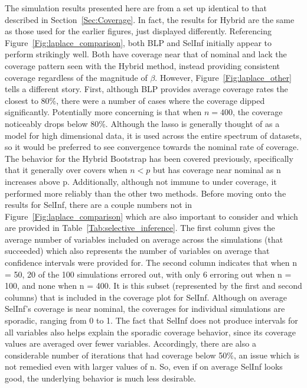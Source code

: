 The simulation results presented here are from a set up identical to that described in Section~\ref{Sec:Coverage}. In fact, the results for Hybrid are the same as those used for the earlier figures, just displayed differently. Referencing Figure~\ref{Fig:laplace_comparison}, both BLP and SelInf initially appear to perform strikingly well. Both have coverage near that of nominal and lack the coverage pattern seen with the Hybrid method, instead providing consistent coverage regardless of the magnitude of $\beta$. However, Figure~\ref{Fig:laplace_other} tells a different story. First, although BLP provides average coverage rates the closest to $80\%$, there were a number of cases where the coverage dipped significantly. Potentially more concerning is that when $n = 400$, the coverage noticeably drops below 80\%. Although the lasso is generally thought of as a model for high dimensional data, it is used across the entire spectrum of datasets, so it would be preferred to see convergence towards the nominal rate of coverage. The behavior for the Hybrid Bootstrap has been covered previously, specifically that it generally over covers when $n < p$ but has coverage near nominal as n increases above p. Additionally, although not immune to under coverage, it performed more reliably than the other two methods. Before moving onto the results for SelInf, there are a couple numbers not in Figure~\ref{Fig:laplace_comparison} which are also important to consider and which are provided in Table~\ref{Tab:selective_inference}. The first column gives the average number of variables included on average across the simulations (that succeeded) which also represents the number of variables on average that confidence intervals were provided for. The second column indicates that when n = 50, 20 of the 100 simulations errored out, with only 6 erroring out when n = 100, and none when n = 400. It is this subset (represented by the first and second columns) that is included in the coverage plot for SelInf. Although on average SelInf's coverage is near nominal, the coverages for individual simulations are sporadic, ranging from 0 to 1. The fact that SelInf does not produce intervals for all variables also helps explain the sporadic coverage behavior, since its coverage values are averaged over fewer variables. Accordingly, there are also a considerable number of iterations that had coverage below 50\%, an issue which is not remedied even with larger values of n. So, even if on average SelInf looks good, the underlying behavior is much less desirable.

